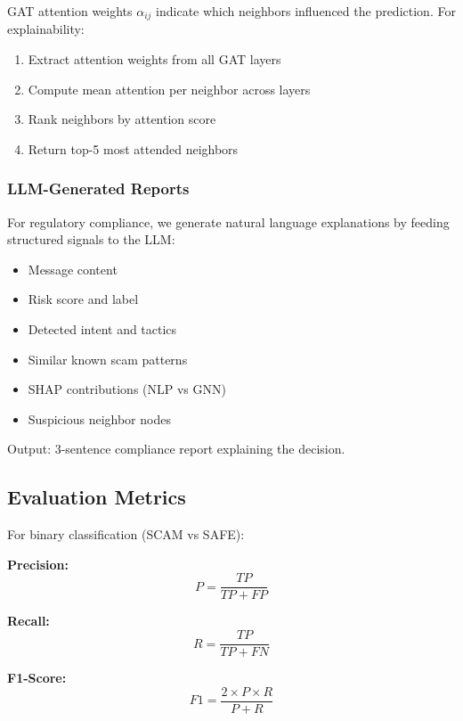 GAT attention weights $\alpha_{ij}$ indicate which neighbors influenced the prediction. For explainability:
\begin{enumerate}
    \item Extract attention weights from all GAT layers
    \item Compute mean attention per neighbor across layers
    \item Rank neighbors by attention score
    \item Return top-5 most attended neighbors
\end{enumerate}

\subsubsection{LLM-Generated Reports}

For regulatory compliance, we generate natural language explanations by feeding structured signals to the LLM:
\begin{itemize}
    \item Message content
    \item Risk score and label
    \item Detected intent and tactics
    \item Similar known scam patterns
    \item SHAP contributions (NLP vs GNN)
    \item Suspicious neighbor nodes
\end{itemize}

Output: 3-sentence compliance report explaining the decision.

\subsection{Evaluation Metrics}

For binary classification (SCAM vs SAFE):

\textbf{Precision:}
\begin{equation}
P = \frac{TP}{TP + FP}
\end{equation}

\textbf{Recall:}
\begin{equation}
R = \frac{TP}{TP + FN}
\end{equation}

\textbf{F1-Score:}
\begin{equation}
F1 = \frac{2 \times P \times R}{P + R}
\end{equation}

